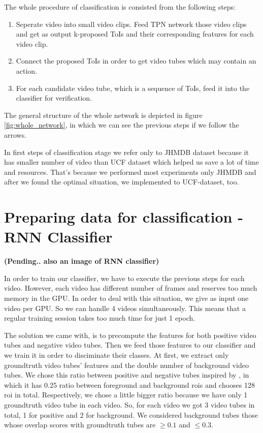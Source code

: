 \documentclass{report}
\begin{document}
The whole procedure of classification is consisted from the following steps:
\begin{enumerate}
\item Seperate video into small video clips. Feed TPN network those video clips and get as output
  k-proposed ToIs and their corresponding features for each video clip.
\item Connect the proposed ToIs in order to get video tubes which may contain an action.
\item For each candidate video tube, which is a sequence of ToIs, feed it into the classifier
  for verification.
\end{enumerate}

The general structure of the whole network is depicted in figure \ref{fig:whole_network}, in which we can see the previous steps if we
follow the arrows.  \par
In first steps of classification stage we refer only to JHMDB dataset because it has smaller number of video than UCF dataset which
helped us save a lot of time and resources. That's because  we performed most experiments only JHMDB and after we found the optimal
situation, we implemented to UCF-dataset, too. 

\section{Preparing data for classification -  RNN Classifier}

\textbf{(Pending.. also an image of RNN classifier)}

In order to train our classifier, we have to execute the previous steps for each video. However, each video
has different number of frames and reserves too much memory in the GPU. In order to deal with this situation,
we give as input one video per GPU. So we can handle 4 videos simultaneously. This means that a regular
training session takes too much time for just 1 epoch. \par
The solution we came with, is to precompute the features for both positive video tubes and negative video tubes.
Then we feed those features to our classifier and we train it in order to disciminate their classes.
At first, we extract only groundtruth video tubes' features and the double number of background video tubes. We chose this
ratio between positive and negative tubes inspired by \cite{jjfaster2rcnn}, in which it has 0.25 ratio between foreground
and background rois and chooses 128 roi in total. Respectively, we chose a little bigger ratio because we have only 1 groundtruth
video tube in each video. So, for each video we got 3 video tubes in total, 1 for positive and 2 for background. We considered
background tubes those whose overlap scores with groundtruth tubes are $ \ge 0.1 $ and $ \le 0.3 $. \par
\end{document}

